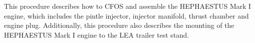 This procedure describes how to CFOS and assemble the HEPHAESTUS Mark I engine, which includes the pintle injector, injector manifold, thrust chamber and engine plug. Additionally, this procedure also describes the mounting of the HEPHAESTUS Mark I engine to the LEA trailer test stand. 